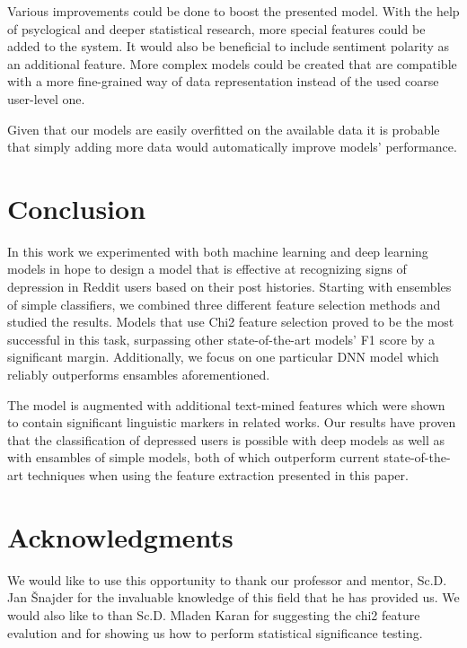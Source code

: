 \documentclass[10pt, a4paper]{article}
\begin{document}
Various improvements could be done to boost the presented model. With the help of psyclogical and deeper statistical research,
 more special features could be added to the system. It would also be beneficial to include sentiment polarity as an additional
 feature. More complex models could be created that are compatible with a more fine-grained way of data representation instead of
 the used coarse user-level one.

 Given that our models are easily overfitted on the available data it is probable that simply adding more data would
 automatically improve models' performance. 

\section{Conclusion}

In this work we experimented with both machine learning and deep learning models in hope to design a model that is effective
 at recognizing signs of depression in Reddit users based on their post histories. Starting with ensembles of simple classifiers,
 we combined three different feature selection methods and studied the results. Models that use Chi2 feature selection
 proved to be the most successful in this task, surpassing other state-of-the-art models' F1 score by a significant margin.
 Additionally, we focus on one particular DNN model which reliably outperforms ensambles aforementioned.

 The model is augmented with additional text-mined features which were shown to contain significant linguistic markers in related
 works. Our results have proven that the classification of depressed users is possible with deep models as well as with ensambles
 of simple models, both of which outperform current state-of-the-art techniques when using the feature extraction presented in this paper.

\section{Acknowledgments}

We would like to use this opportunity to thank our professor and mentor, Sc.D. Jan Šnajder for the invaluable knowledge of this field that he
 has provided us. We would also like to than Sc.D. Mladen Karan for suggesting the chi2 feature evalution and for showing us
 how to perform statistical significance testing.



\end{document}
